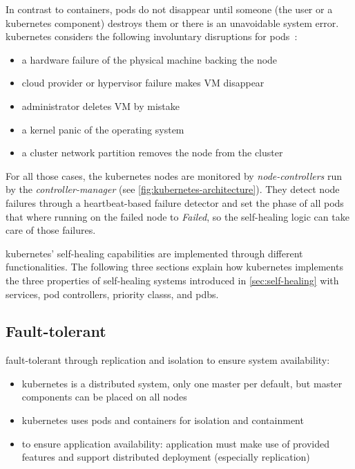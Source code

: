   In contrast to containers, pods do not disappear until someone (the user or a \gls{kubernetes} component) destroys them or there is an unavoidable system error.
  \Gls{kubernetes} considers the following involuntary disruptions for pods~\cite{kubernetes}:

  \begin{itemize}
    \item a hardware failure of the physical machine backing the node
    \item cloud provider or hypervisor failure makes VM disappear
    \item administrator deletes VM by mistake
    \item a kernel panic of the operating system
    \item a cluster network partition removes the node from the cluster
  \end{itemize}

  For all those cases, the \gls{kubernetes} nodes are monitored by \textit{node-controllers} run by the \textit{controller-manager} (see \cref{fig:kubernetes-architecture}).
  They detect node failures through a heartbeat-based failure detector and set the phase of all pods that where running on the failed node to \textit{Failed}, so the self-healing logic can take care of those failures.

  \Gls{kubernetes}' self-healing capabilities are implemented through different functionalities.
  The following three sections explain how \gls{kubernetes} implements the three properties of self-healing systems introduced in \cref{sec:self-healing} with services, \glspl{pod controller}, \glspl{priority class}, and \glspl{pdb}.

\subsection{Fault-tolerant}\label{sec:self-healing-kubernetes:fault-tolerant}
  fault-tolerant through replication and isolation to ensure system availability:
  \begin{itemize}
    \item \gls{kubernetes} is a distributed system, only one master per default, but master components can be placed on all nodes
    \item \gls{kubernetes} uses pods and containers for isolation and containment
    \item to ensure application availability: application must make use of provided features and support distributed deployment (especially replication)
  \end{itemize}

